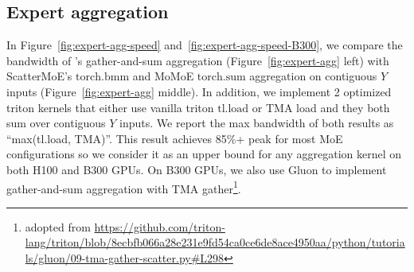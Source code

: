 
\subsection{Expert aggregation} \label{sec:appendix:expert_agg}

In Figure~\ref{fig:expert-agg-speed} and~\ref{fig:expert-agg-speed-B300}, we compare the bandwidth of \Algname's gather-and-sum aggregation (Figure~\ref{fig:expert-agg} left) with ScatterMoE's $\mathrm{torch.bmm}$ and MoMoE $\mathrm{torch.sum}$ aggregation on contiguous $Y$ inputs (Figure~\ref{fig:expert-agg} middle). In addition, we implement 2 optimized triton kernels that either use vanilla triton $\mathrm{tl.load}$ or TMA load and they both sum over contiguous $Y$ inputs. We report the max bandwidth of both results as ``max(tl.load, TMA)''. This result achieves 85\%+ peak for most MoE configurations so we consider it as an upper bound for any aggregation kernel on both H100 and B300 GPUs. On B300 GPUs, we also use Gluon to implement gather-and-sum aggregation with TMA gather\footnote{adopted from \scriptsize\url{https://github.com/triton-lang/triton/blob/8ecbfb066a28e231e9fd54ca0ce6de8ace4950aa/python/tutorials/gluon/09-tma-gather-scatter.py\#L298}}.



